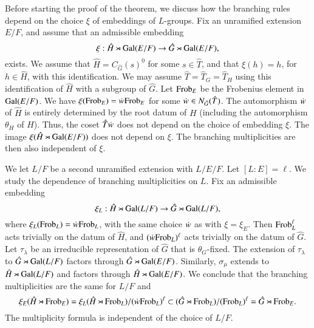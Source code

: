 Before starting the proof of the theorem, we discuss how the branching rules depend on the choice $\xi$ of embeddings
of $L$-groups.
Fix an unramified extension $E/F$, and assume that an admissible embedding
\[
\xi:\hat H \rtimes {\operatorname{Gal}}(E/F)\to \hat G \rtimes {\operatorname{Gal}}(E/F),
\]
exists.  
We assume that $\hat H = C_{\hat G}(s)^0$ for some $s\in \hat T$, and that $\xi(h) = h$, for $h \in \hat H$,
with this identification.  We may assume $\hat T = \hat T_G = \hat T_H$ using this identification of $\hat H$ with a subgroup of $\hat G$.
Let ${\operatorname{Frob}}_{E}$ be the Frobenius element in ${\operatorname{Gal}}(E/F)$.
We have $\xi({\operatorname{Frob}}_{E}) = \dot w {\operatorname{Frob}}_E$ for some $\dot w \in N_{\hat G}(\hat T)$.  The automorphism $\dot w $ of $\hat H$ is entirely determined
by the root datum of $H$ (including the automorphism $\theta_H$ of $H$).  Thus, the coset $\hat T \dot w $ does not
depend on the choice of embedding $\xi$.  The image $\xi(\hat H\rtimes {\operatorname{Gal}}(E/F))$ does not depend on $\xi$.
The branching multiplicities are then also independent of $\xi$.

We let $L/F$ be a second unramified extension with $L/E/F$.  Let  $[L:E]=\ell$.  We study the  dependence
of branching multiplicities on $L$.  Fix an admissible embedding
\[
\xi_L:\hat H \rtimes {\operatorname{Gal}}(L/F)\to \hat G \rtimes {\operatorname{Gal}}(L/F),
\]
where $\xi_L({\operatorname{Frob}}_L) = \dot w  {\operatorname{Frob}}_L$, with the same choice $\dot w $ as with $\xi = \xi_E$.
Then ${\operatorname{Frob}}_L^\ell$ acts trivially on the datum of $\hat H$, and $(\dot w  {\operatorname{Frob}}_L)^\ell$ acts trivially on the datum of $\hat G$.
Let $\tau_\lambda$ be an irreducible representation of $\hat G$ that is $\theta_G$-fixed.  The extension of 
$\tau_\lambda$ to $\hat G\rtimes {\operatorname{Gal}}(L/F)$ factors through $\hat G\rtimes {\operatorname{Gal}}(E/F)$.
Similarly, $\sigma_\mu$ extends to $\hat H\rtimes {\operatorname{Gal}}(L/F)$ and factors through $\hat H\rtimes{\operatorname{Gal}}(E/F)$.
We conclude that the branching multiplicities are the same for $L/F$ and
\[
\xi_E(\hat H \rtimes {\operatorname{Frob}}_E) = \xi_L(\hat H\rtimes {\operatorname{Frob}}_L)/(\dot w {\operatorname{Frob}}_L)^\ell \subset (\hat G\rtimes {\operatorname{Frob}}_L)/( {\operatorname{Frob}}_L)^\ell = \hat G\rtimes {\operatorname{Frob}}_E.
\]
The multiplicity formula is independent of the choice of $L/F$.

